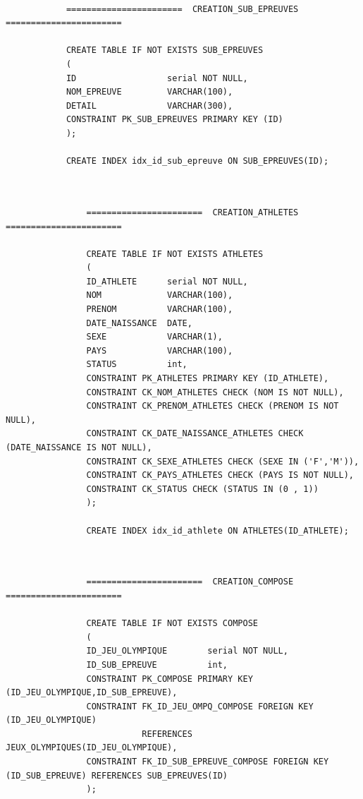 \documentclass[]{scrreprt}
\begin{document}
			{\footnotesize 
			\begin{verbatim}
			
			=======================  CREATION_SUB_EPREUVES  =======================
			
			CREATE TABLE IF NOT EXISTS SUB_EPREUVES
			(
			ID                  serial NOT NULL,
			NOM_EPREUVE         VARCHAR(100),
			DETAIL              VARCHAR(300),
			CONSTRAINT PK_SUB_EPREUVES PRIMARY KEY (ID)
			);
			
			CREATE INDEX idx_id_sub_epreuve ON SUB_EPREUVES(ID);
			
				\end{verbatim}}
			
			
			{\footnotesize 
				\begin{verbatim}
				
				=======================  CREATION_ATHLETES  =======================
				
				CREATE TABLE IF NOT EXISTS ATHLETES
				(
				ID_ATHLETE      serial NOT NULL,
				NOM             VARCHAR(100),
				PRENOM          VARCHAR(100),
				DATE_NAISSANCE  DATE,
				SEXE            VARCHAR(1),
				PAYS            VARCHAR(100),
				STATUS          int,
				CONSTRAINT PK_ATHLETES PRIMARY KEY (ID_ATHLETE),
				CONSTRAINT CK_NOM_ATHLETES CHECK (NOM IS NOT NULL),
				CONSTRAINT CK_PRENOM_ATHLETES CHECK (PRENOM IS NOT NULL),
				CONSTRAINT CK_DATE_NAISSANCE_ATHLETES CHECK (DATE_NAISSANCE IS NOT NULL),
				CONSTRAINT CK_SEXE_ATHLETES CHECK (SEXE IN ('F','M')),
				CONSTRAINT CK_PAYS_ATHLETES CHECK (PAYS IS NOT NULL),
				CONSTRAINT CK_STATUS CHECK (STATUS IN (0 , 1))
				);
				
				CREATE INDEX idx_id_athlete ON ATHLETES(ID_ATHLETE);
				
				\end{verbatim}}
			
			{\footnotesize 
				\begin{verbatim}
				
				=======================  CREATION_COMPOSE  =======================
				
				CREATE TABLE IF NOT EXISTS COMPOSE
				(
				ID_JEU_OLYMPIQUE        serial NOT NULL,
				ID_SUB_EPREUVE          int,
				CONSTRAINT PK_COMPOSE PRIMARY KEY (ID_JEU_OLYMPIQUE,ID_SUB_EPREUVE),
				CONSTRAINT FK_ID_JEU_OMPQ_COMPOSE FOREIGN KEY (ID_JEU_OLYMPIQUE) 
				           REFERENCES JEUX_OLYMPIQUES(ID_JEU_OLYMPIQUE),
				CONSTRAINT FK_ID_SUB_EPREUVE_COMPOSE FOREIGN KEY (ID_SUB_EPREUVE) REFERENCES SUB_EPREUVES(ID)
				);
				
				\end{verbatim}}
			
\end{document}
